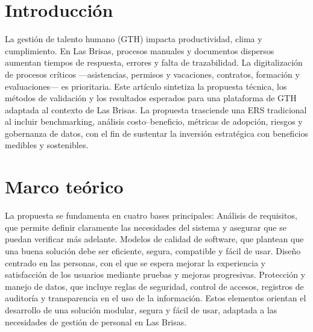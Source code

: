 \section{Introducción}
La gestión de talento humano (GTH) impacta productividad, clima y cumplimiento. En Las Brisas, procesos manuales y documentos dispersos aumentan tiempos de respuesta, errores y falta de trazabilidad. La digitalización de procesos críticos —asistencias, permisos y vacaciones, contratos, formación y evaluaciones— es prioritaria. Este artículo sintetiza la propuesta técnica, los métodos de validación y los resultados esperados para una plataforma de GTH adaptada al contexto de Las Brisas. La propuesta trasciende una ERS tradicional al incluir benchmarking, análisis costo–beneficio, métricas de adopción, riesgos y gobernanza de datos, con el fin de sustentar la inversión estratégica con beneficios medibles y sostenibles.

\section{Marco teórico}
La propuesta se fundamenta en cuatro bases principales: Análisis de requisitos, que permite definir claramente las necesidades del sistema y asegurar que se puedan verificar más adelante. Modelos de calidad de software, que plantean que una buena solución debe ser eficiente, segura, compatible y fácil de usar. Diseño centrado en las personas, con el que se espera mejorar la experiencia y satisfacción de los usuarios mediante pruebas y mejoras progresivas. Protección y manejo de datos, que incluye reglas de seguridad, control de accesos, registros de auditoría y transparencia en el uso de la información. Estos elementos orientan el desarrollo de una solución modular, segura y fácil de usar, adaptada a las necesidades de gestión de personal en Las Brisas.